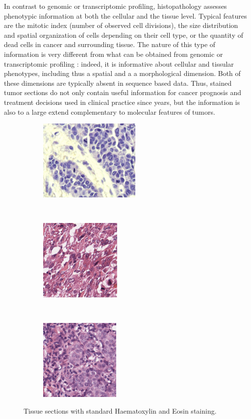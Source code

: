 \documentclass[a4paper,10pt]{article}
\begin{document}
In contrast to genomic or transcriptomic
profiling, histopathology assesses phenotypic information at both the
cellular and the tissue level. Typical features are the mitotic index
(number of observed cell divisions), the size distribution and spatial
organization of cells depending on their cell type, 
or the quantity of dead cells in cancer and surrounding tissue. The
nature of this type of information is very different from what can be
obtained from genomic or transcriptomic profiling : indeed, it is
informative about cellular and tissular phenotypes, including thus a
spatial and a a morphological dimension.  Both of these dimensions are
typically absent in sequence based data. Thus,
stained tumor sections do not only contain useful information for
cancer prognosis and treatment decisions used in clinical practice
since years, but the information is also
to a large extend complementary to molecular features of tumors. 

\begin{figure}[!ht]
\centering
\begin{subfigure}{.3\textwidth}
  \centering
  \includegraphics[height=4cm]{histo1.png}
  \caption{}
  \label{fig:sub1}
\end{subfigure}%
~
\begin{subfigure}{.3\textwidth}
  \centering
  \includegraphics[height=4cm]{histo2.png}
  \caption{}
  \label{ProbabilityMapLocalMaxima}
\end{subfigure}
~
\begin{subfigure}{.3\textwidth}
  \centering
  \includegraphics[height=4cm]{histo3.png}
  \caption{}
\end{subfigure}
\caption{Tissue sections with standard Haematoxylin and Eosin staining.}
\label{fig:example_histopath}
\end{figure}
\end{document}
